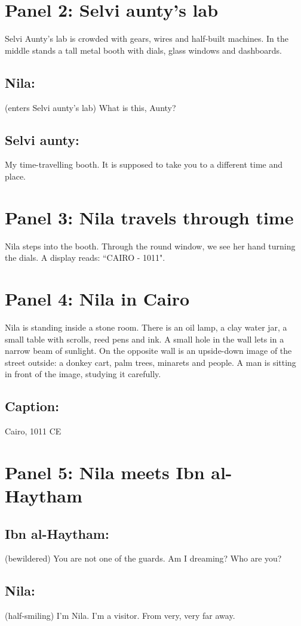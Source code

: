 \documentclass{xtufte-handout}
\begin{document}
\section{Panel 2: Selvi aunty's lab}
Selvi Aunty's lab is crowded with gears, wires and half-built machines. In the middle stands a tall metal booth with dials, glass windows and dashboards.
\subsection{Nila:} (enters Selvi aunty's lab) What is this, Aunty?
\subsection{Selvi aunty:} My time-travelling booth. It is supposed to take you to a different time and place.

\section{Panel 3: Nila travels through time}
Nila steps into the booth. Through the round window, we see her hand turning the dials. A display reads: ``CAIRO - 1011". 
\section{Panel 4: Nila in Cairo}
Nila is standing inside a stone room. There is an oil lamp, a clay water jar, a small table with scrolls, reed pens and ink. A small hole in the wall lets in a narrow beam of sunlight. On the opposite wall is an upside-down image of the street outside: a donkey cart, palm trees, minarets and people. A man is sitting in front of the image, studying it carefully.
\subsection{Caption:} Cairo, 1011 CE

\section{Panel 5: Nila meets Ibn al-Haytham}
\subsection{Ibn al-Haytham:} (bewildered) You are not one of the guards. Am I dreaming? Who are you?
\subsection{Nila:} (half-smiling) I'm Nila. I'm a visitor. From very, very far away.
\end{document}
